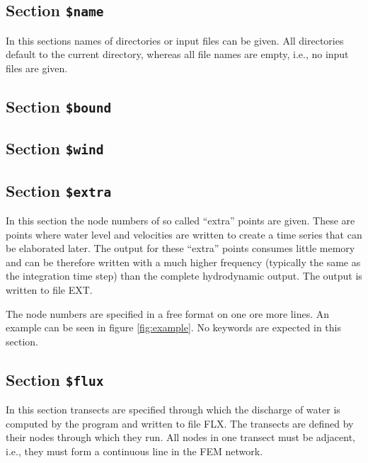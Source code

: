 \documentclass{report}
\begin{document}
\subsection{Section {\tt \$name}}

In this sections names of directories or input files can be
given. All directories default to the current directory,
whereas all file names are empty, i.e., no input files are
given.




\subsection{Section {\tt \$bound}}




\subsection{Section {\tt \$wind}}





\subsection{Section {\tt \$extra}}

In this section the node numbers of so called ``extra'' points are given. 
These are points where water level and velocities are written to create
a time series that can be elaborated later. The output for these ``extra''
points consumes little memory and can be therefore written with a
much higher frequency (typically the same as the integration time step)
than the complete hydrodynamic output. The output is written
to file EXT.

The node numbers are specified in a free format on one ore more lines.
An example can be seen in figure \ref{fig:example}. No keywords
are expected in this section.


\subsection{Section {\tt \$flux}}

In this section transects are specified through which the discharge
of water is computed by the program and written to file FLX.
The transects are defined by their nodes through which they run.
All nodes in one transect must be adjacent, i.e., they must form a
continuous line in the FEM network.
\end{document}
